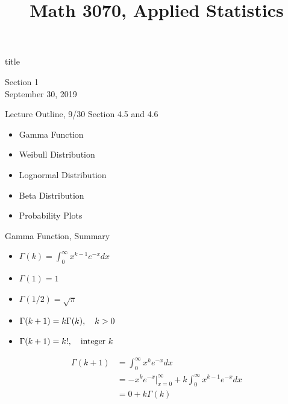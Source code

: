 \documentclass[handout]{beamer}
\title{Math 3070, Applied Statistics}
\newcommand{\nl}[1]{\vspace{#1 em}}
\begin{document}
\begin{frame}
    \begin{beamercolorbox}[rounded=true,wd=\textwidth,center]{title}
        \inserttitle
    \end{beamercolorbox}
    \begin{center}
        Section 1\\
        \nl{0.5}
        September 30, 2019
    \end{center}
\end{frame}
\begin{frame}{Lecture Outline, 9/30}
    Section 4.5 and 4.6
    \begin{itemize}
        \item Gamma Function
        \item Weibull Distribution
        \item Lognormal Distribution
        \item Beta Distribution
        \item Probability Plots
    \end{itemize}
\end{frame}
\begin{frame}{Gamma Function, Summary}
    \begin{block}{}
        \begin{itemize}
            \item $\Gamma(k) = \int_{0}^\infty x^{k-1}e^{-x} dx$
            \item $ \Gamma(1) = 1 $
            \item $ \Gamma(1/2) = \sqrt{\pi} $
            \item $ \Gamma(k+1) = k\Gamma(k), \hskip1 em k>0$
            \item $ \Gamma(k+1) = k!, \hskip1 em \text{integer } k$
        \end{itemize}
    \end{block}
    \begin{align*}
        \Gamma(k+1) & = \int_{0}^\infty x^{k}e^{-x} dx                                    \\
                    & = -x^{k}e^{-x}\bigg|_{x=0}^\infty + k\int_0^\infty x^{k-1}e^{-x} dx \\
                    & = 0+ k\Gamma(k)                                                     \\
    \end{align*}
    \vfill
\end{frame}
\end{document}
